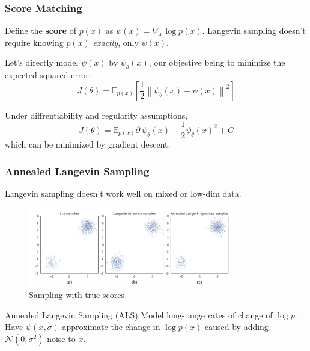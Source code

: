 \documentclass{beamer}
\begin{document}
\begin{frame}
    \frametitle{Score Matching}
    Define the \textbf{score} of $p(x)$ as $\psi(x) = \nabla_x \log p(x)$. Langevin sampling doesn't require knowing $p(x)$ \textit{exactly}, only $\psi(x)$.

    Let's directly model $\psi(x)$ by $\psi_\theta(x)$, our objective being to minimize the expected squared error:
    \[J(\theta) = \mathbb{E}_{p(x)} \left[ \frac{1}{2} \left\| \psi_\theta(x) - \psi(x) \right\|^2 \right]\]

    Under diffrentiability and regularity assumptions,
    \[J(\theta) = \mathbb{E}_{p(x)} \partial \ \psi_\theta(x) + \frac{1}{2} \psi_\theta(x)^2 + C\]
    which can be minimized by gradient descent.
\end{frame}

\begin{frame}
    \frametitle{Annealed Langevin Sampling}
    Langevin sampling doesn't work well on mixed or low-dim data.
    
    \begin{figure}
        \centering
        \includegraphics[width=0.8\textwidth]{images/langevin.png}
        \caption[]{Sampling with true scores}
        \label{fig:als}
    \end{figure}

    \begin{block}{Annealed Langevin Sampling (ALS)}
        Model long-range rates of change of $\log p$. Have $\psi(x, \sigma)$ approximate the change in $\log p(x)$ caused by adding $\mathcal{N}(0, \sigma^2)$ noise to $x$.
    \end{block}
\end{frame}
\end{document}
